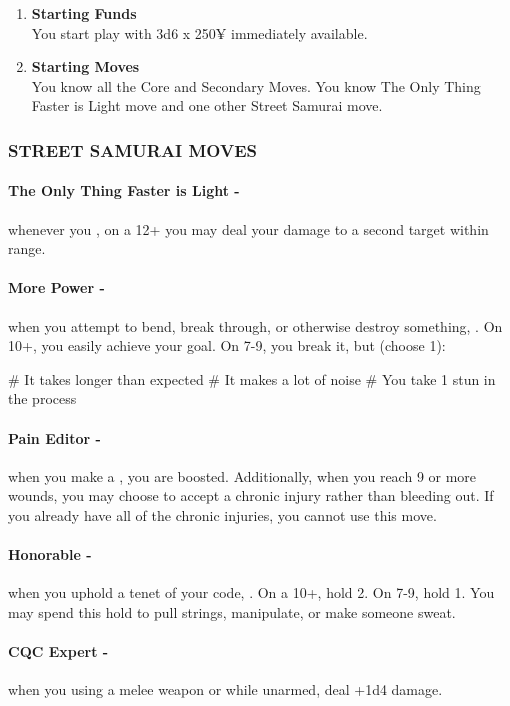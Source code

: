 \begin{enumerate}
    \item \textbf{Starting Funds} \\
    You start play with 3d6 x 250¥ immediately available.
    
    \item \textbf{Starting Moves} \\
    You know all the Core and Secondary Moves. You know The Only Thing Faster is Light move and one other Street Samurai move.
\end{enumerate}

\subsubsection{STREET SAMURAI MOVES}
\paragraph{The Only Thing Faster is Light -} whenever you , on a 12+ you may deal your damage to a second target within range.

\paragraph{More Power -} when you attempt to bend, break through, or otherwise destroy something, . On 10+, you easily achieve your goal. On 7-9, you break it, but (choose 1):
    \begin{easylist}
        # It takes longer than expected
        # It makes a lot of noise
        # You take 1 stun in the process
    \end{easylist}

\paragraph{Pain Editor -} when you make a , you are boosted. Additionally, when you reach 9 or more wounds, you may choose to accept a chronic injury rather than bleeding out. If you already have all of the chronic injuries, you cannot use this move.

\paragraph{Honorable -} when you uphold a tenet of your code, . On a 10+, hold 2. On 7-9, hold 1. You may spend this hold to pull strings, manipulate, or make someone sweat.

\paragraph{CQC Expert -} when you  using a melee weapon or while unarmed, deal +1d4 damage.

